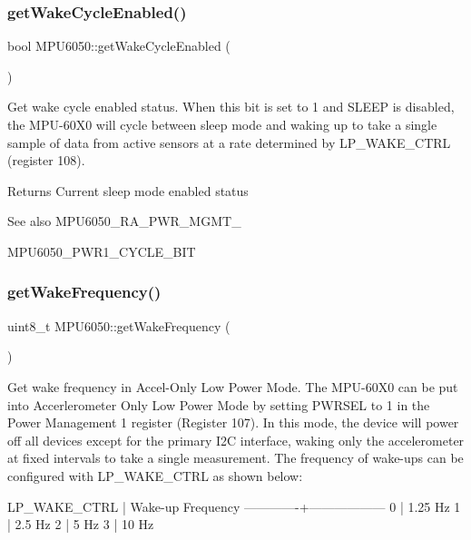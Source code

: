 \subsubsection{\texorpdfstring{getWakeCycleEnabled()}{getWakeCycleEnabled()}}
{\footnotesize\ttfamily bool M\+P\+U6050\+::get\+Wake\+Cycle\+Enabled (\begin{DoxyParamCaption}{ }\end{DoxyParamCaption})}

Get wake cycle enabled status. When this bit is set to 1 and S\+L\+E\+EP is disabled, the M\+P\+U-\/60\+X0 will cycle between sleep mode and waking up to take a single sample of data from active sensors at a rate determined by L\+P\+\_\+\+W\+A\+K\+E\+\_\+\+C\+T\+RL (register 108). \begin{DoxyReturn}{Returns}
Current sleep mode enabled status 
\end{DoxyReturn}
\begin{DoxySeeAlso}{See also}
M\+P\+U6050\+\_\+\+R\+A\+\_\+\+P\+W\+R\+\_\+\+M\+G\+M\+T\+\_ 

M\+P\+U6050\+\_\+\+P\+W\+R1\+\_\+\+C\+Y\+C\+L\+E\+\_\+\+B\+IT 
\end{DoxySeeAlso}
\mbox{\label{class_m_p_u6050_a249a905ae4572a462414f2d94236258a}} 
\subsubsection{\texorpdfstring{getWakeFrequency()}{getWakeFrequency()}}
{\footnotesize\ttfamily uint8\+\_\+t M\+P\+U6050\+::get\+Wake\+Frequency (\begin{DoxyParamCaption}{ }\end{DoxyParamCaption})}

Get wake frequency in Accel-\/\+Only Low Power Mode. The M\+P\+U-\/60\+X0 can be put into Accerlerometer Only Low Power Mode by setting P\+W\+R\+S\+EL to 1 in the Power Management 1 register (Register 107). In this mode, the device will power off all devices except for the primary I2C interface, waking only the accelerometer at fixed intervals to take a single measurement. The frequency of wake-\/ups can be configured with L\+P\+\_\+\+W\+A\+K\+E\+\_\+\+C\+T\+RL as shown below\+:


\begin{DoxyPre}
LP\_WAKE\_CTRL | Wake-up Frequency
-------------+------------------
0            | 1.25 Hz
1            | 2.5 Hz
2            | 5 Hz
3            | 10 Hz
\end{DoxyPre}


